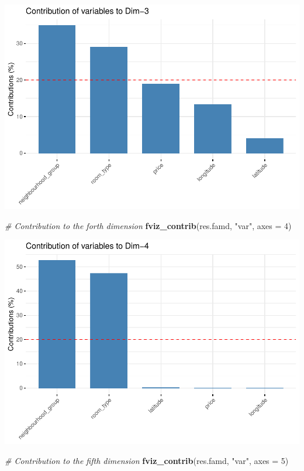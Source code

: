 \documentclass[
]{article}
\newenvironment{Shaded}{\begin{snugshade}}{\end{snugshade}}
\newcommand{\CommentTok}[1]{\textcolor[rgb]{0.56,0.35,0.01}{\textit{#1}}}
\newcommand{\DataTypeTok}[1]{\textcolor[rgb]{0.13,0.29,0.53}{#1}}
\newcommand{\DecValTok}[1]{\textcolor[rgb]{0.00,0.00,0.81}{#1}}
\newcommand{\KeywordTok}[1]{\textcolor[rgb]{0.13,0.29,0.53}{\textbf{#1}}}
\newcommand{\NormalTok}[1]{#1}
\newcommand{\StringTok}[1]{\textcolor[rgb]{0.31,0.60,0.02}{#1}}
\begin{document}
\includegraphics{project-code_files/figure-latex/unnamed-chunk-38-4.pdf}

\begin{Shaded}
\begin{Highlighting}[]
\CommentTok{# Contribution to the forth dimension}
\KeywordTok{fviz_contrib}\NormalTok{(res.famd, }\StringTok{"var"}\NormalTok{, }\DataTypeTok{axes =} \DecValTok{4}\NormalTok{)}
\end{Highlighting}
\end{Shaded}

\includegraphics{project-code_files/figure-latex/unnamed-chunk-38-5.pdf}

\begin{Shaded}
\begin{Highlighting}[]
\CommentTok{# Contribution to the fifth dimension}
\KeywordTok{fviz_contrib}\NormalTok{(res.famd, }\StringTok{"var"}\NormalTok{, }\DataTypeTok{axes =} \DecValTok{5}\NormalTok{)}
\end{Highlighting}
\end{Shaded}
\end{document}
